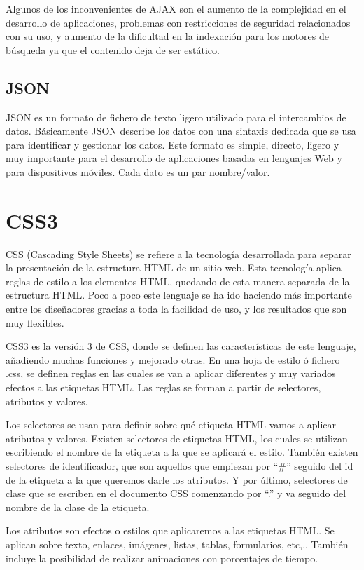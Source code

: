 \documentclass[a4paper, 12pt]{book}
\begin{document}
Algunos de los inconvenientes de AJAX son el aumento de la complejidad en el desarrollo de aplicaciones, problemas con restricciones de seguridad 
relacionados con su uso, y aumento de la dificultad en la indexaci\'on para los motores de b\'usqueda ya que el contenido deja de ser est\'atico.


\subsection{JSON}
\label{subsec:json}
JSON es un formato de fichero de texto ligero utilizado para el intercambios de datos. B\'asicamente JSON describe los datos con una sintaxis dedicada 
que se usa para identificar y gestionar los datos. Este formato es simple, directo, ligero y muy importante para el desarrollo de aplicaciones basadas 
en lenguajes Web y para dispositivos m\'oviles. Cada dato es un par nombre/valor.


\section{CSS3}
\label{sec:css3}
CSS (Cascading Style Sheets) se refiere a la tecnolog\'ia desarrollada para separar la presentaci\'on de la estructura HTML de un sitio web. 
Esta tecnolog\'ia aplica reglas de estilo a los elementos HTML, quedando de esta manera separada de la estructura HTML. Poco a poco este lenguaje se 
ha ido haciendo m\'as importante entre los dise\~nadores gracias a toda la facilidad de uso, y los resultados que son muy flexibles.

CSS3 es la versi\'on 3 de CSS, donde se definen las caracter\'isticas de este lenguaje, a\~nadiendo muchas funciones y mejorado otras.
En una hoja de estilo \'o fichero .css, se definen reglas en las cuales se van a aplicar diferentes y muy variados efectos a las etiquetas HTML.
Las reglas se forman a partir de selectores, atributos y valores. 

Los selectores se usan para definir sobre qu\'e etiqueta HTML vamos a aplicar atributos y valores. Existen selectores de etiquetas HTML, los cuales 
se utilizan escribiendo el nombre de la etiqueta a la que se aplicar\'a el estilo. Tambi\'en existen selectores de identificador, que son aquellos que 
empiezan por ``\#'' seguido del id de la etiqueta a la que queremos darle los atributos. Y por \'ultimo, selectores de clase que se escriben en el 
documento CSS comenzando por ``.'' y va seguido del nombre de la clase de la etiqueta.

Los atributos son efectos o estilos que aplicaremos a las etiquetas HTML. Se aplican sobre texto, enlaces, im\'agenes, listas, tablas, formularios, 
etc,.. Tambi\'en incluye la posibilidad de realizar animaciones con porcentajes de tiempo.
\end{document}

